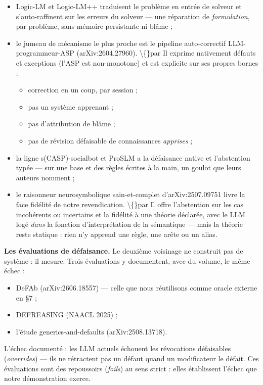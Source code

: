 \documentclass[11pt]{article}
\begin{document}
\begin{itemize}
\item Logic-LM et Logic-LM++ traduisent le problème en entrée de solveur et s'auto-raffinent sur les erreurs du solveur — une réparation de \emph{formulation}, par problème, sans mémoire persistante ni blâme ;
\item le jumeau de mécanisme le plus proche est le pipeline auto-correctif LLM-programmeur-ASP (arXiv:2604.27960). \textbackslash\{\}par Il exprime nativement défauts et exceptions (l'ASP est non-monotone) et est explicite sur ses propres bornes :

\begin{itemize}
\item correction en un coup, par session ;
\item pas un système apprenant ;
\item pas d'attribution de blâme ;
\item pas de révision défaisable de connaissances \emph{apprises} ;

\end{itemize}
\item la ligne s(CASP)-socialbot et ProSLM a la défaisance native et l'abstention typée — sur une base et des règles écrites à la main, un goulot que leurs auteurs nomment ;
\item le raisonneur neurosymbolique sain-et-complet d'arXiv:2507.09751 livre la face fidélité de notre revendication. \textbackslash\{\}par Il offre l'abstention sur les cas incohérents ou incertains et la fidélité à une théorie déclarée, avec le LLM logé \emph{dans} la fonction d'interprétation de la sémantique — mais la théorie reste statique : rien n'y apprend une règle, une arête ou un alias.
\end{itemize}

\textbf{Les évaluations de défaisance.} Le deuxième voisinage ne construit pas de système : il mesure. Trois évaluations y documentent, avec du volume, le même échec :

\begin{itemize}
\item DeFAb (arXiv:2606.18557) — celle que nous réutilisons comme oracle externe en §7 ;
\item DEFREASING (NAACL 2025) ;
\item l'étude generics-and-defaults (arXiv:2508.13718).
\end{itemize}

L'échec documenté : les LLM actuels échouent les révocations défaisables (\emph{overrides}) — ils ne rétractent pas un défaut quand un modificateur le défait. Ces évaluations sont des repoussoirs (\emph{foils}) au sens strict : elles établissent l'échec que notre démonstration exerce.
\end{document}
